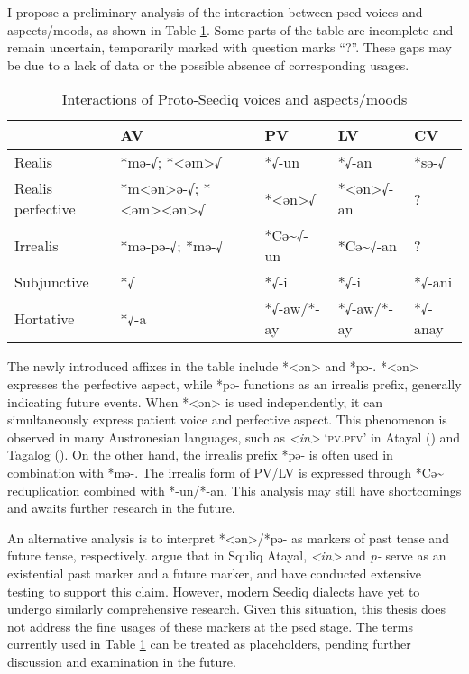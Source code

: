 I propose a preliminary analysis of the interaction between \acl{psed} voices and aspects/moods, as shown in Table \ref{tab:psed_voice_tam}. Some parts of the table are incomplete and remain uncertain, temporarily marked with question marks ``?''. These gaps may be due to a lack of data or the possible absence of corresponding usages.

\begin{table}[!htbp]
\centering
\caption{Interactions of Proto-Seediq voices and aspects/moods}
\label{tab:psed_voice_tam}
\begin{tabular}{lllll}
\hline
                  & AV                    & PV            & LV             & CV      \\ \hline
Realis            & *mə-√; *<əm>√         & *√-un         & *√-an          & *sə-√   \\
Realis perfective & *m<ən>ə-√; *<əm><ən>√ & *<ən>√        & *<ən>√-an      & ?       \\
Irrealis          & *mə-pə-√; *mə-√       & *Cə\~{}√-un   & *Cə\~{}√-an    & ?       \\
Subjunctive        & *√                    & *√-i          & *√-i           & *√-ani  \\
Hortative         & *√-a                  & *√-aw/*-ay    & *√-aw/*-ay     & *√-anay \\ \hline
\end{tabular}
\end{table}

The newly introduced affixes in the table include *<ən> and *pə-. *<ən> expresses the perfective aspect, while *pə- functions as an irrealis prefix, generally indicating future events. When *<ən> is used independently, it can simultaneously express patient voice and perfective aspect. This phenomenon is observed in many Austronesian languages, such as \textit{<in>} `\textsc{pv.pfv}' in Atayal (\cite{huang1995}) and Tagalog (\cite{schachter_otanes1972tagalog}). On the other hand, the irrealis prefix *pə- is often used in combination with *mə-. The irrealis form of PV/LV is expressed through *Cə\~{} reduplication combined with *-un/*-an. This analysis may still have shortcomings and awaits further research in the future.

An alternative analysis is to interpret *<ən>/*pə- as markers of past tense and future tense, respectively. \textcite{chen2018, chen2024} argue that in Squliq Atayal, \textit{<in>} and \textit{p-} serve as an existential past marker and a future marker, and have conducted extensive testing to support this claim. However, modern Seediq dialects have yet to undergo similarly comprehensive research. Given this situation, this thesis does not address the fine usages of these markers at the \acl{psed} stage. The terms currently used in Table \ref{tab:psed_voice_tam} can be treated as placeholders, pending further discussion and examination in the future.

